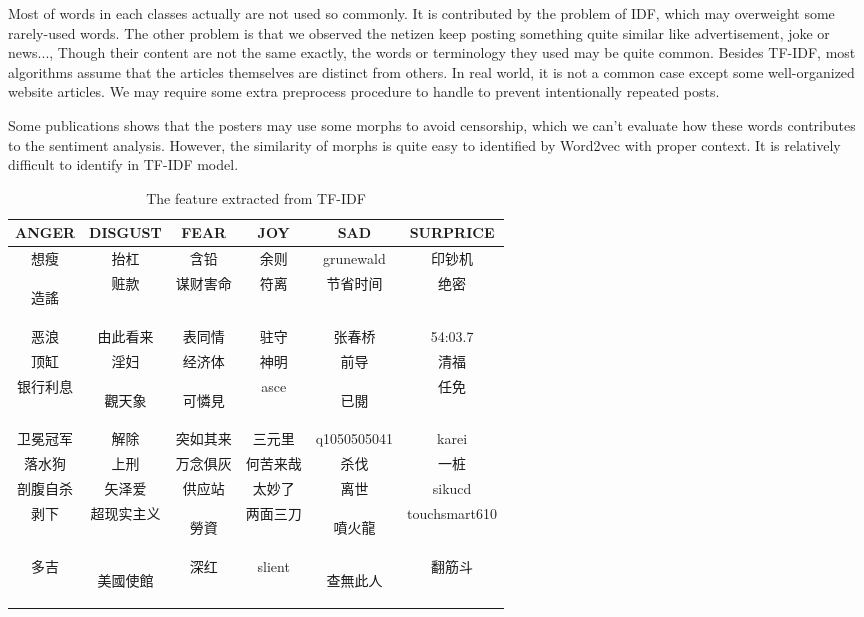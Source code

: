 Most of words in each classes actually are not used so commonly. It is contributed by the problem of IDF, which may overweight some rarely-used words.
The other problem is that we observed the netizen keep posting something quite similar like advertisement, joke or news..., 
Though their content are not the same exactly, the words or terminology they used may be quite common. 
Besides TF-IDF, most algorithms assume that the articles themselves are distinct from others. In real world, it is not a common case except some well-organized website articles.
We may require some extra preprocess procedure to handle to prevent intentionally repeated posts.

Some publications\cite{Chen2013TUP25129382512940} shows that the posters may use some morphs to avoid censorship, which we can't evaluate how these words contributes to the sentiment analysis. 
However, the similarity of morphs is quite easy to identified by Word2vec with proper context. 
It is relatively difficult to identify in TF-IDF model. 
\begin{CJK}{UTF8}{gbsn}
\begin{table}[]
\centering
\caption{The feature extracted from TF-IDF}
\label{table:featureoftfidf}
\begin{tabular}{|c|c|c|c|c|c|}
ANGER	& DISGUST	& FEAR	& JOY	& SAD	& SURPRICE \\
\hline
想瘦	&抬杠	&含铅	&余则	&grunewald	&印钞机 \\
\begin{CJK}{UTF8}{bkai}造謠\end{CJK}	&赃款	&谋财害命	&符离	&节省时间	&绝密\\
恶浪	&由此看来	&表同情	&驻守	&张春桥	&54:03.7\\
顶缸	&淫妇	&经济体	&神明	&前导	&清福\\
银行利息	&\begin{CJK}{UTF8}{bkai}觀天象\end{CJK}	&\begin{CJK}{UTF8}{bkai}可憐見\end{CJK}	&asce	&\begin{CJK}{UTF8}{bkai}已閱\end{CJK}	&任免\\
卫冕冠军	&解除	&突如其来	&三元里	&q1050505041	&karei\\
落水狗	&上刑	&万念俱灰	&何苦来哉	&杀伐	&一桩\\
剖腹自杀	&矢泽爱	&供应站	&太妙了	&离世	&sikucd\\
剥下	&超现实主义	&\begin{CJK}{UTF8}{bkai}勞資\end{CJK}	&两面三刀	&\begin{CJK}{UTF8}{bkai}噴火龍\end{CJK}	&touchsmart610\\
多吉	&\begin{CJK}{UTF8}{bkai}美國使館\end{CJK}	&深红	&slient	&\begin{CJK}{UTF8}{bkai}查無此人\end{CJK}	&翻筋斗
\end{tabular}
\end{table}
\end{CJK}

